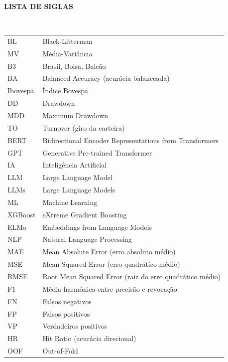 \newpage

\begin{center}
\textbf{LISTA DE SIGLAS}
\end{center}
$\!$\\

\begin{tabular}{l@{\hspace{1cm}}p{11cm}}

BL & Black-Litterman \\
MV & Média-Variância \\
B3 & Brasil, Bolsa, Balcão \\
BA & Balanced Accuracy (acurácia balanceada) \\
Ibovespa & Índice Bovespa \\
DD & Drawdown \\
MDD & Maximum Drawdown \\
TO & Turnover (giro da carteira) \\
BERT & Bidirectional Encoder Representations from Transformers \\
GPT & Generative Pre-trained Transformer \\
IA & Inteligência Artificial \\
LLM & Large Language Model \\
LLMs & Large Language Models \\
ML & Machine Learning \\
XGBoost & eXtreme Gradient Boosting \\
ELMo & Embeddings from Language Models \\
NLP & Natural Language Processing \\
MAE & Mean Absolute Error (erro absoluto médio) \\
MSE & Mean Squared Error (erro quadrático médio) \\
RMSE & Root Mean Squared Error (raiz do erro quadrático médio) \\
F1 & Média harmônica entre precisão e revocação \\
FN & Falsos negativos \\
FP & Falsos positivos \\
VP & Verdadeiros positivos \\
HR & Hit Ratio (acurácia direcional) \\
OOF & Out-of-Fold \\
\end{tabular}